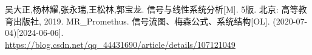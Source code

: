 \begin{thebibliography}{99}%
     吴大正,杨林耀,张永瑞,王松林,郭宝龙. 信号与线性系统分析[M]. 5版. 北京: 高等教育出版社, 2019.
     MR\_Promethus. 信号流图、梅森公式、系统结构[OL]. (2020-07-04)[2024-06-06]. \\\url{https://blog.csdn.net/qq_44431690/article/details/107121049}
\end{thebibliography}
